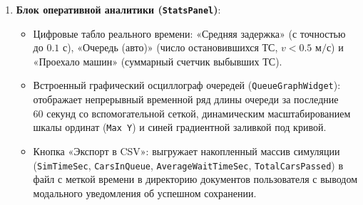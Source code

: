 \documentclass[11pt, a4paper]{article}
\begin{document}
\begin{enumerate}
\begin{itemize}
  \end{itemize}
  \item \textbf{Блок оперативной аналитики (\texttt{StatsPanel})}:
  \begin{itemize}
    \item Цифровые табло реального времени: «Средняя задержка» (с точностью до $0.1\text{ с}$), «Очередь (авто)» (число остановившихся ТС, $v < 0.5\text{ м/с}$) и «Проехало машин» (суммарный счетчик выбывших ТС).
    \item Встроенный графический осциллограф очередей (\texttt{QueueGraphWidget}): отображает непрерывный временной ряд длины очереди за последние $60\text{ секунд}$ со вспомогательной сеткой, динамическим масштабированием шкалы ординат (\texttt{Max Y}) и синей градиентной заливкой под кривой.
    \item Кнопка «Экспорт в CSV»: выгружает накопленный массив симуляции (\texttt{SimTimeSec}, \texttt{CarsInQueue}, \texttt{AverageWaitTimeSec}, \texttt{TotalCarsPassed}) в файл с меткой времени в директорию документов пользователя с выводом модального уведомления об успешном сохранении.
  \end{itemize}
\end{enumerate}
\end{document}
